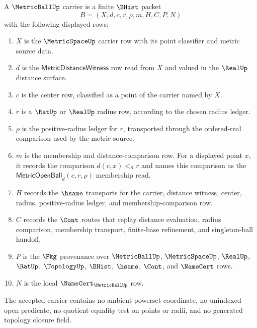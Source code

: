 \begin{definition}
\label{def:metric-ball-carrier}
A $\MetricBallUp$ carrier is a finite $\BHist$ packet
$$
B=(X,d,c,r,\rho,m,H,C,P,N)
$$
with the following displayed rows:
\begin{enumerate}
\item $X$ is the $\MetricSpaceUp$ carrier row with its point classifier and metric source data.
\item $d$ is the $\mathsf{MetricDistanceWitness}$ row read from $X$ and valued in the $\RealUp$ distance surface.
\item $c$ is the center row, classified as a point of the carrier named by $X$.
\item $r$ is a $\RatUp$ or $\RealUp$ radius row, according to the chosen radius ledger.
\item $\rho$ is the positive-radius ledger for $r$, transported through the ordered-real comparison used by the metric source.
\item $m$ is the membership and distance-comparison row. For a displayed point $x$, it records the comparison $d(c,x)<_{\mathsf R}r$ and names this comparison as the $\mathsf{MetricOpenBall}_d(c,r,\rho)$ membership read.
\item $H$ records the $\hsame$ transports for the carrier, distance witness, center, radius, positive-radius ledger, and membership-comparison row.
\item $C$ records the $\Cont$ routes that replay distance evaluation, radius comparison, membership transport, finite-base refinement, and singleton-ball handoff.
\item $P$ is the $\Pkg$ provenance over $\MetricBallUp$, $\MetricSpaceUp$, $\RealUp$, $\RatUp$, $\TopologyUp$, $\BHist$, $\hsame$, $\Cont$, and $\NameCert$ rows.
\item $N$ is the local $\NameCert_{\MetricBallUp}$ row.
\end{enumerate}
The accepted carrier contains no ambient powerset coordinate, no unindexed open predicate, no quotient equality test on points or radii, and no generated topology closure field.
\end{definition}

